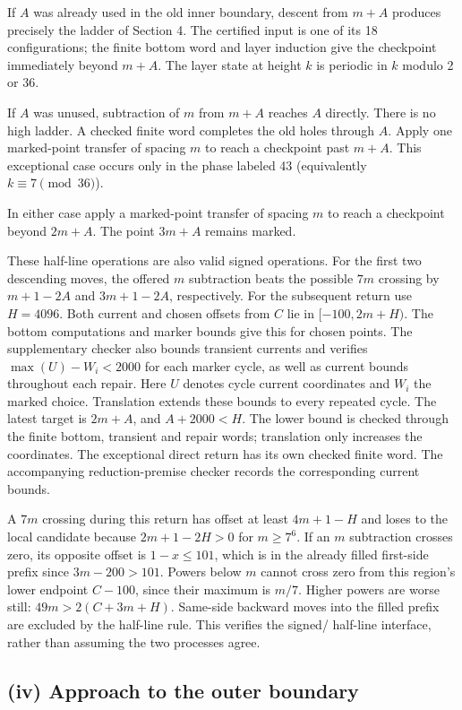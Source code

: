 \documentclass[11pt,a4paper]{article}
\begin{document}
If $A$ was already used in the old inner boundary, descent from $m+A$ produces precisely the ladder of Section 4. The certified input is one of its 18 configurations; the finite bottom word and layer induction give the checkpoint immediately beyond $m+A$. The layer state at height $k$ is periodic in $k$ modulo 2 or 36.

If $A$ was unused, subtraction of $m$ from $m+A$ reaches $A$ directly. There is no high ladder. A checked finite word completes the old holes through $A$. Apply one marked-point transfer of spacing $m$ to reach a checkpoint past $m+A$. This exceptional case occurs only in the phase labeled 43 (equivalently $k\equiv7\pmod{36}$).

In either case apply a marked-point transfer of spacing $m$ to reach a checkpoint beyond $2m+A$. The point $3m+A$ remains marked.

These half-line operations are also valid signed operations. For the first two descending moves, the offered $m$ subtraction beats the possible $7m$ crossing by $m+1-2A$ and $3m+1-2A$, respectively. For the subsequent return use $H=4096$. Both current and chosen offsets from $C$ lie in $[-100,2m+H)$. The bottom computations and marker bounds give this for chosen points. The supplementary checker also bounds transient currents and verifies $\max(U)-W_i<2000$ for each marker cycle, as well as current bounds throughout each repair. Here $U$ denotes cycle current coordinates and $W_i$ the marked choice. Translation extends these bounds to every repeated cycle. The latest target is $2m+A$, and $A+2000<H$. The lower bound is checked through the finite bottom, transient and repair words; translation only increases the coordinates. The exceptional direct return has its own checked finite word. The accompanying reduction-premise checker records the corresponding current bounds.

A $7m$ crossing during this return has offset at least $4m+1-H$ and loses to the local candidate because $2m+1-2H>0$ for $m\ge7^6$. If an $m$ subtraction crosses zero, its opposite offset is $1-x\le101$, which is in the already filled first-side prefix since $3m-200>101$. Powers below $m$ cannot cross zero from this region's lower endpoint $C-100$, since their maximum is $m/7$. Higher powers are worse still: $49m>2(C+3m+H)$. Same-side backward moves into the filled prefix are excluded by the half-line rule. This verifies the signed/ half-line interface, rather than assuming the two processes agree.

\subsection*{(iv) Approach to the outer boundary}
\end{document}
